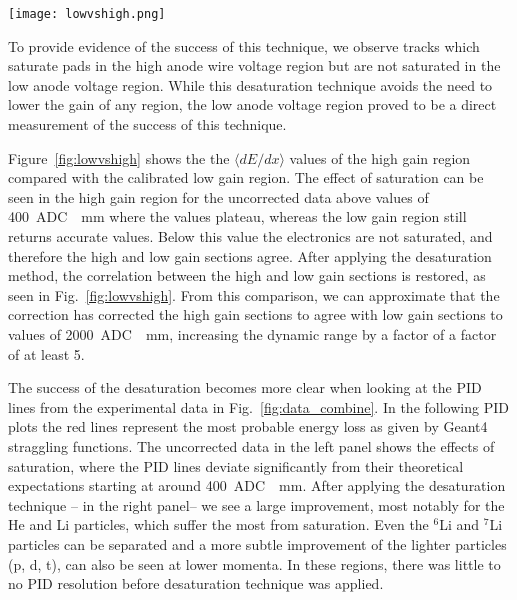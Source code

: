 \begin{figure*}[!htb]
\centering
\texttt{[image: lowvshigh.png]}
\caption{Uncorrected (left panel) and desaturated (right panel) collision data comparing the low gain region to the high gain anode regions of the TPC.}
\label{fig:lowvshigh}
\end{figure*}

To provide evidence of the success of this technique, we observe tracks which saturate pads in the high anode wire voltage region but are not saturated in the low anode voltage region. While this desaturation technique avoids the need to lower the gain of any region, the low anode voltage region proved to be a direct measurement of the success of this technique.
 
Figure~\ref{fig:lowvshigh} shows the the $\langle dE/dx\rangle$ values of the high gain region compared with the calibrated low gain region. The effect of saturation can be seen in the high gain region for the uncorrected data above values of \SI{400}{ADC \per \milli\metre} where the values plateau, whereas the low gain region still returns accurate values. Below this value the electronics are not saturated, and therefore the high and low gain sections agree. After applying the desaturation method, the correlation between the high and low gain sections is restored, as seen in Fig.~\ref{fig:lowvshigh}. From this comparison, we can approximate that the correction has corrected the high gain sections to agree with low gain sections to values of \SI{2000}{ADC \per \milli\metre}, increasing the dynamic range by a factor of a factor of at least 5.

The success of the desaturation becomes more clear when looking at the PID lines from the experimental data in Fig.~\ref{fig:data_combine}. In the following PID plots the red lines represent the most probable energy loss as given by Geant4 straggling functions. The uncorrected data in the left panel shows the effects of saturation, where the PID lines deviate significantly from their theoretical expectations starting at around \SI{400}{ADC \per \milli\metre}. After applying the desaturation technique -- in the right panel-- we see a large improvement, most notably for the He and Li particles, which suffer the most from saturation. Even the ${}^{6}$Li and ${}^{7}$Li particles can be separated and a more subtle improvement of the lighter particles (p, d, t), can also be seen at lower momenta. In these regions, there was little to no PID resolution before desaturation technique was applied.  


